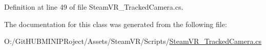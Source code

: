 Definition at line 49 of file Steam\+V\+R\+\_\+\+Tracked\+Camera.\+cs.



The documentation for this class was generated from the following file\+:\begin{DoxyCompactItemize}
\item 
O\+:/\+Git\+H\+U\+B\+M\+I\+N\+I\+P\+Roject/\+Assets/\+Steam\+V\+R/\+Scripts/\mbox{\hyperlink{_steam_v_r___tracked_camera_8cs}{Steam\+V\+R\+\_\+\+Tracked\+Camera.\+cs}}\end{DoxyCompactItemize}
